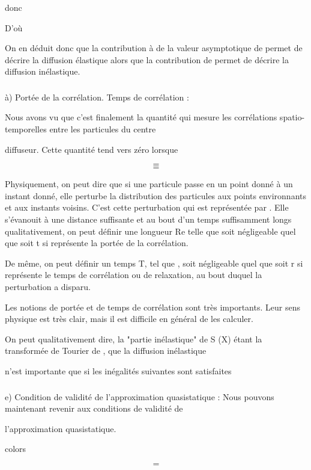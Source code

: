 donc

D'où

On en déduit donc que la contribution à  de la valeur asymptotique de
 permet de décrire la diffusion élastique alors que la contribution de
 permet de décrire la diffusion inélastique.
\subsubsection{}%
à) Portée de la corrélation. Temps de corrélation :

Nous avons vu que c'est finalement la quantité  qui
mesure les corrélations spatio-temporelles entre les particules du centre

diffuseur. Cette quantité tend vers zéro lorsque

\[
\tag{146}=
\]
\[
\tag{147}=
\]

Physiquement, on peut dire que si une particule passe en un
point donné à un instant donné, elle perturbe la distribution des particules
aux points environnants et aux instants voisins. C'est cette perturbation qui
est représentée par . Elle s'évanouit à une distance suffisante et
au bout d'un temps suffisamment longs qualitativement, on peut définir une
longueur Re telle que  soit négligeable quel que soit t si
 représente la portée de la corrélation.

De même, on peut définir un temps T, tel que ,  soit
négligeable quel que soit r si  représente le temps de corrélation ou de relaxation,
au bout duquel la perturbation a disparu.

Les notions de portée et de temps de corrélation sont très importants. Leur sens
physique est très clair, mais il est difficile en général
de les calculer.

On peut qualitativement dire, la "partie inélastique" de S (X)
étant la transformée de Tourier de , que la diffusion inélastique

n'est importante que si les inégalités suivantes sont satisfaites

\subsubsection{}%
e) Condition de validité de l'approximation quasistatique :
Nous pouvons maintenant revenir aux conditions de validité de

l'approximation quasistatique.

colors


\[
\tag{148}=
\]

